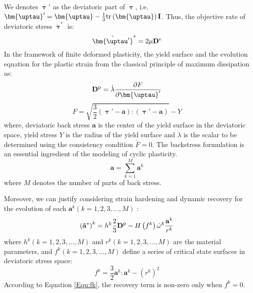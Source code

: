 We denotes $\bm{\uptau}'$ as the deviatoric part of $\bm{\uptau}$, i.e. ${\bm{\uptau}}' = {\bm{\uptau }} - \frac{1}{3}{\rm{tr}}\left( {\bm{\uptau }} \right){\mathbf{I}}$.
Thus, the objective rate of deviatoric stress ${\mathring {\bm{\uptau }}^{*}}$ is:
\begin{equation}
{\mathring {\bm{\uptau'}}^{*}} = 2\mu {{\mathbf{D}}^{\rm{e}}}
\end{equation}
In the framework of finite deformed plasticity, the yield surface and the evolution equation for the plastic strain from the classical principle of maximum dissipation as:
\begin{equation}
{{{\mathbf{D}}^{\rm{p}}}} = \dot \lambda \frac{{\partial F}}{{\partial {\bm{\uptau }'}}}
\end{equation}
\begin{equation}
F = \sqrt {\frac{3}{2}\left( {{\bm{\uptau}}' - {\mathbf{a}}} \right):\left( {{\bm{\uptau}}' - {\mathbf{a}}} \right)}  - Y
\end{equation}
where, deviatoric back stress ${\mathbf{a}}$ is the center of the yield surface in the deviatoric space, yield stress $Y$ is the radius of the yield surface and $\dot \lambda$ is the scalar to be determined using the consistency condition $\dot F = 0$.
The backstress formulation is an essential ingredient of the modeling of cyclic plasticity.
\begin{equation}
{\mathbf{a}} = \sum\limits_{k = 1}^M {{{\mathbf{a}}^k}}
\end{equation}
where $M$ denotes the number of parts of back stress.

Moreover, we can justify considering strain hardening and dynamic recovery for the evolution of each ${{\mathbf{a}}^k} ( k = 1,2,3,...,M )$ :
\begin{equation}
\label{Equ:dotak1}
\left({\mathbf{\mathring a}}^{*}\right)^k = {h^k}\frac{2}{3}{{{\mathbf{D}}^{\rm{p}}}} - H\left( {{f^k}} \right){\dot \omega ^k}\frac{{{{\mathbf{a}}^k}}}{{{r^k}}}
\end{equation}
where ${{{h}}^k} ( k = 1,2,3,...,M )$ and ${{{r}}^k} ( k = 1,2,3,...,M )$ are the material parameters, and ${{{f}}^k} ( k = 1,2,3,...,M )$ define a series of critical state surfaces in deviatoric stress space:
\begin{equation}
\label{Equ:fk}
{f^k} = \frac{3}{2}{{\mathbf{a}}^k}:{{\mathbf{a}}^k} - {\left( {{r^k}} \right)^2}
\end{equation}
According to Equation \ref{Equ:fk}, the recovery term is non-zero only when ${f^k} = 0$.

